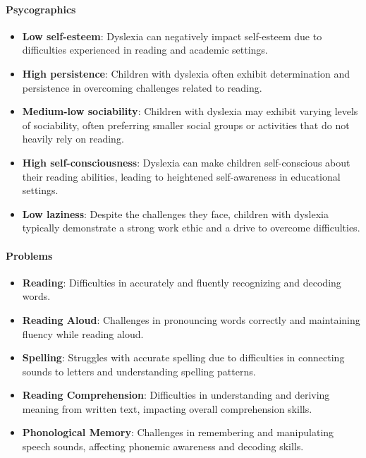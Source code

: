 \paragraph{\textbf{Psycographics}}
\begin{itemize}
    \item \textbf{Low self-esteem}: Dyslexia can negatively impact self-esteem due to difficulties experienced in reading and academic settings. \cite{dyslexiaUnderstanding}
    \item \textbf{High persistence}: Children with dyslexia often exhibit determination and persistence in overcoming challenges related to reading. \cite{dyslexiaStatistics}
    \item \textbf{Medium-low sociability}: Children with dyslexia may exhibit varying levels of sociability, often preferring smaller social groups or activities that do not heavily rely on reading. \cite{dyslexiaClinic}
    \item \textbf{High self-consciousness}: Dyslexia can make children self-conscious about their reading abilities, leading to heightened self-awareness in educational settings.
    \item \textbf{Low laziness}: Despite the challenges they face, children with dyslexia typically demonstrate a strong work ethic and a drive to overcome difficulties. \cite{dyslexiaStatistics}
\end{itemize}

\paragraph{\textbf{Problems}}
\begin{itemize}
    \item \textbf{Reading}: Difficulties in accurately and fluently recognizing and decoding words. \cite{dyslexiaCharAndSigns}
    \item \textbf{Reading Aloud}: Challenges in pronouncing words correctly and maintaining fluency while reading aloud. \cite{dyslexiaCharAndSigns}
    \item \textbf{Spelling}: Struggles with accurate spelling due to difficulties in connecting sounds to letters and understanding spelling patterns. \cite{dyslexiaCharAndSigns}
    \item \textbf{Reading Comprehension}: Difficulties in understanding and deriving meaning from written text, impacting overall comprehension skills.\cite{dyslexiaCharAndSigns}
    \item \textbf{Phonological Memory}: Challenges in remembering and manipulating speech sounds, affecting phonemic awareness and decoding skills. \cite{dyslexiaCharAndSigns}
\end{itemize}

